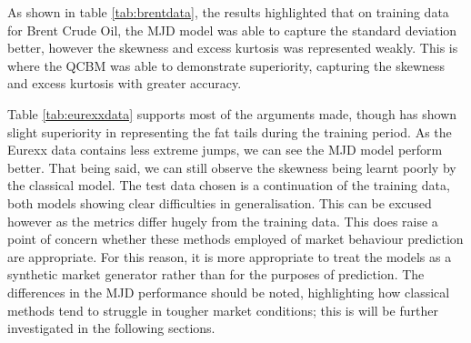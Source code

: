 \documentclass[12pt]{article}
\newcommand{\newp}
    {
    \vskip 0.5cm 
  }
\numberwithin{equation}{section}
\begin{document}
As shown in table \ref{tab:brentdata}, the results highlighted that on training data 
for Brent Crude Oil, the 
MJD model was able to capture the standard deviation better, however the skewness 
and excess kurtosis was represented weakly. This is where the QCBM was able to 
demonstrate superiority, 
capturing the skewness and excess kurtosis with greater accuracy.
\newp 
Table \ref{tab:eurexxdata} supports most of the arguments made, though has shown 
slight superiority in representing the fat tails during the training period. 
As the Eurexx data contains less extreme jumps, we can see the MJD model perform 
better. That being said, we can still observe the skewness being learnt poorly
by the classical model. The test data chosen is a continuation of the training data,
both models showing clear difficulties in generalisation. This can be excused however 
as the metrics differ hugely from the training data. This does raise a point of 
concern whether these methods employed of market behaviour prediction are 
appropriate. For this reason, it is more appropriate to treat the models as a 
synthetic market generator rather than for the purposes of prediction. The differences 
in the MJD performance should be noted, highlighting how classical methods 
tend to struggle in tougher market conditions; this is will be further investigated 
in the following sections.
\end{document}
